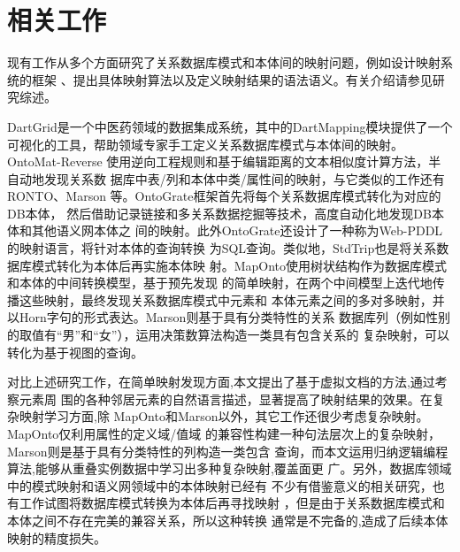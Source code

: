 \chapter{相关工作}
\label{chap05}

现有工作从多个方面研究了关系数据库模式和本体间的映射问题，例如设计映射系统的框架
、提出具体映射算法以及定义映射结果的语法语义。有关介绍请参见研究综述\cite{4,7}。

DartGrid是一个中医药领域的数据集成系统\cite{25}，其中的DartMapping模块提供了一个
可视化的工具，帮助领域专家手工定义关系数据库模式与本体间的映射。OntoMat-Reverse
\cite{26}使用逆向工程规则和基于编辑距离的文本相似度计算方法，半自动地发现关系数
据库中表/列和本体中类/属性间的映射，与它类似的工作还有RONTO\cite{27}、Marson
\cite{24}等。OntoGrate框架\cite{28}首先将每个关系数据库模式转化为对应的DB本体，
然后借助记录链接和多关系数据挖掘等技术，高度自动化地发现DB本体和其他语义网本体之
间的映射。此外OntoGrate还设计了一种称为Web-PDDL的映射语言，将针对本体的查询转换
为SQL查询。类似地，StdTrip\cite{29}也是将关系数据库模式转化为本体后再实施本体映
射。MapOnto\cite{10}使用树状结构作为数据库模式和本体的中间转换模型，基于预先发现
的简单映射，在两个中间模型上迭代地传播这些映射，最终发现关系数据库模式中元素和
本体元素之间的多对多映射，并以Horn字句的形式表达。Marson则基于具有分类特性的关系
数据库列（例如性别的取值有``男''和``女''），运用决策数算法构造一类具有包含关系的
复杂映射，可以转化为基于视图的查询。

对比上述研究工作，在简单映射发现方面,本文提出了基于虚拟文档的方法,通过考察元素周
围的各种邻居元素的自然语言描述，显著提高了映射结果的效果。在复杂映射学习方面,除
MapOnto和Marson以外，其它工作还很少考虑复杂映射。MapOnto仅利用属性的定义域/值域
的兼容性构建一种句法层次上的复杂映射，Marson则是基于具有分类特性的列构造一类包含
查询，而本文运用归纳逻辑编程算法,能够从重叠实例数据中学习出多种复杂映射,覆盖面更
广。另外，数据库领域中的模式映射\cite{30}和语义网领域中的本体映射\cite{31}已经有
不少有借鉴意义的相关研究，也有工作试图将数据库模式转换为本体后再寻找映射
\cite{28,29}，但是由于关系数据库模式和本体之间不存在完美的兼容关系，所以这种转换
通常是不完备的,造成了后续本体映射的精度损失。

